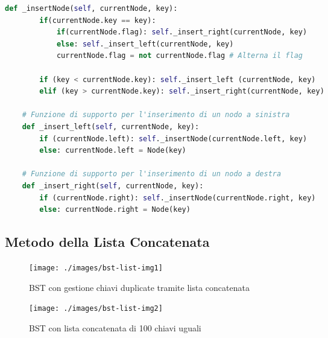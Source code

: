 \documentclass{article}
\begin{document}
\begin{lstlisting}[language=Python]
    def _insertNode(self, currentNode, key):        
        if(currentNode.key == key):
            if(currentNode.flag): self._insert_right(currentNode, key)
            else: self._insert_left(currentNode, key)
            currentNode.flag = not currentNode.flag # Alterna il flag
    
        if (key < currentNode.key): self._insert_left (currentNode, key)
        elif (key > currentNode.key): self._insert_right(currentNode, key)

    # Funzione di supporto per l'inserimento di un nodo a sinistra
    def _insert_left(self, currentNode, key):
        if (currentNode.left): self._insertNode(currentNode.left, key)
        else: currentNode.left = Node(key)

    # Funzione di supporto per l'inserimento di un nodo a destra
    def _insert_right(self, currentNode, key):
        if (currentNode.right): self._insertNode(currentNode.right, key)
        else: currentNode.right = Node(key)
\end{lstlisting}











\subsection{Metodo della Lista Concatenata}
\label{subsec:list-implementation}

\begin{figure}[htbp]
  \begin{minipage}{0.48\textwidth}  %
    \centering
    \texttt{[image: ./images/bst-list-img1]}
    \caption{BST con gestione chiavi duplicate tramite lista concatenata}
    \label{fig:bst-list-img1}
  \end{minipage}%
  \hfill  %
  \begin{minipage}{0.48\textwidth}  %
    \centering
    \texttt{[image: ./images/bst-list-img2]}
    \caption{BST con lista concatenata di 100 chiavi uguali}
    \label{fig:bst-list-img2}
  \end{minipage}
\end{figure}
\end{document}
